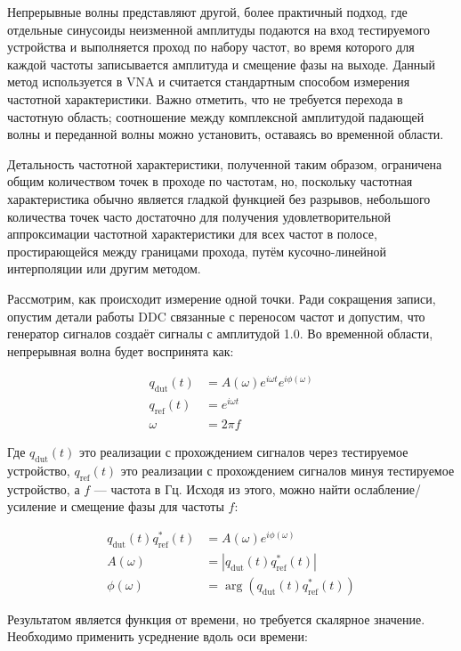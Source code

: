 \documentclass{report}
\begin{document}
Непрерывные волны представляют другой, более практичный подход, где отдельные синусоиды неизменной амплитуды подаются на вход тестируемого устройства и выполняется проход по набору частот, во время которого для каждой частоты записывается амплитуда и смещение фазы на выходе. Данный метод используется в VNA и считается стандартным способом измерения частотной характеристики. Важно отметить, что не требуется перехода в частотную область; соотношение между комплексной амплитудой падающей волны и переданной волны можно установить, оставаясь во временной области.

Детальность частотной характеристики, полученной таким образом, ограничена общим количеством точек в проходе по частотам, но, поскольку частотная характеристика обычно является гладкой функцией без разрывов, небольшого количества точек часто достаточно для получения удовлетворительной аппроксимации частотной характеристики для всех частот в полосе, простирающейся между границами прохода, путём кусочно-линейной интерполяции или другим методом.

Рассмотрим, как происходит измерение одной точки. Ради сокращения записи, опустим  детали работы DDC связанные с переносом частот и допустим, что генератор сигналов создаёт сигналы с амплитудой 1.0. Во временной области, непрерывная волна будет воспринята как:

\begin{align}
q_\text{dut}(t) &= A(\omega) e^{i \omega t} e^{i \phi(\omega) } \\
q_\text{ref}(t) &= e^{i \omega t} \\
\omega &= 2 \pi f
\end{align}

Где $q_\text{dut}(t)$ это реализации с прохождением сигналов через тестируемое устройство, $q_\text{ref}(t)$ это реализации с прохождением сигналов минуя тестируемое устройство, а $f$ --- частота в Гц. Исходя из этого, можно найти ослабление/усиление и смещение фазы для частоты $f$:

\begin{align}
q_\text{dut}(t) q^*_\text{ref}(t) &= A(\omega) e^{i \phi(\omega) } \\
A(\omega) &= \left| q_\text{dut}(t) q^*_\text{ref}(t) \right| \\
\phi(\omega) &= \arg\left( q_\text{dut}(t) q^*_\text{ref}(t) \right)
\end{align}

Результатом является функция от времени, но требуется скалярное значение. Необходимо применить усреднение вдоль оси времени:
\end{document}
